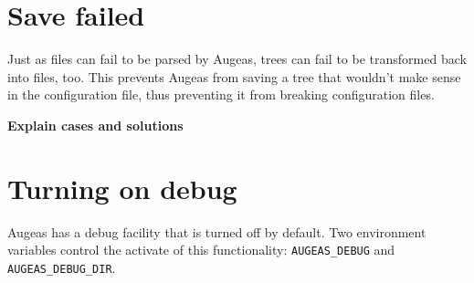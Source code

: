\section{Save failed}

Just as files can fail to be parsed by Augeas, trees can fail to be transformed back into files, too. This prevents Augeas from saving a tree that wouldn't make sense in the configuration file, thus preventing it from breaking configuration files.

\textbf{Explain cases and solutions}

\section{Turning on debug}

 

Augeas has a debug facility that is turned off by default. Two environment variables control the activate of this functionality: \verb!AUGEAS_DEBUG! and \verb!AUGEAS_DEBUG_DIR!.


